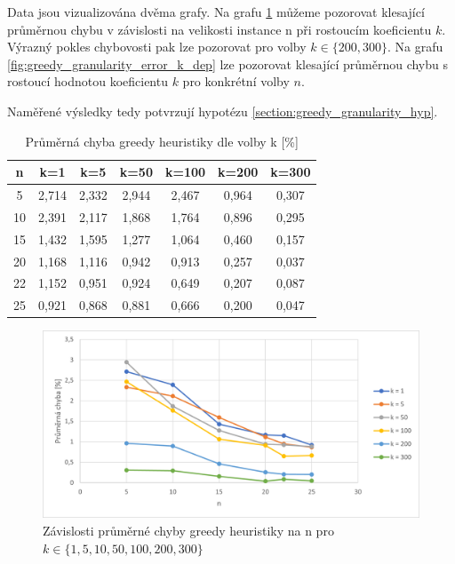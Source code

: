 \documentclass[12pt]{article}
\begin{document}
Data jsou vizualizována dvěma grafy. Na grafu \ref{fig:greedy_granularity_error_n_dep} můžeme pozorovat klesající průměrnou chybu v závislosti na velikosti instance n při rostoucím koeficientu $k$. Výrazný pokles chybovosti pak lze pozorovat pro volby $k \in \{200, 300\}$. Na grafu \ref{fig:greedy_granularity_error_k_dep} lze pozorovat klesající průměrnou chybu s rostoucí hodnotou koeficientu $k$ pro konkrétní volby $n$.

Naměřené výsledky tedy potvrzují hypotézu \ref{section:greedy_granularity_hyp}.

\begin{table}
    \begin{center}
         \begin{tabular}{|c | c | c | c | c | c | c|} 
         \hline
         n & k=1 & k=5 & k=50 & k=100 & k=200 & k=300 \\ [0.1ex] 
         \hline\hline
            5 & 2,714 & 2,332 & 2,944 & 2,467 & 0,964 & 0,307 \\
            \hline
            10 & 2,391 & 2,117 & 1,868 & 1,764 & 0,896 & 0,295 \\
            \hline
            15 & 1,432 & 1,595 & 1,277 & 1,064 & 0,460 & 0,157 \\
            \hline
            20 & 1,168 & 1,116 & 0,942 & 0,913 & 0,257 & 0,037 \\
            \hline
            22 & 1,152 & 0,951 & 0,924 & 0,649 & 0,207 & 0,087 \\
            \hline
            25 & 0,921 & 0,868 & 0,881 & 0,666 & 0,200 & 0,047 \\
            \hline
        \end{tabular}
        \caption{Průměrná chyba greedy heuristiky dle volby k [\%]}
        \label{tab:greedy_granularity_error}
    \end{center}
\end{table}

\begin{figure}[ht]\centering
    \includegraphics[width=1\textwidth, keepaspectratio]{graphs/greedy/granularity/greedy_granularity_error_n_dep.png}
    \caption{Závislosti průměrné chyby greedy heuristiky na n pro $k \in \{1, 5, 10, 50, 100, 200, 300\}$}
    \label{fig:greedy_granularity_error_n_dep}
\end{figure}
\end{document}
